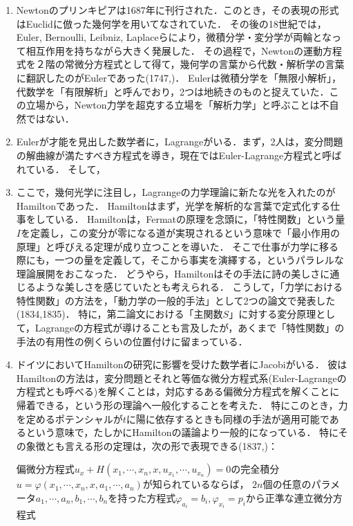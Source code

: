 \documentclass[uplatex, dvipdfmx]{jsarticle}
\begin{document}
\begin{enumerate}
    \item Newtonのプリンキピアは1687年に刊行された．このとき，その表現の形式はEuclidに倣った幾何学を用いてなされていた．
    その後の18世紀では，Euler, Bernoulli, Leibniz, Laplaceらにより，微積分学・変分学が両輪となって相互作用を持ちながら大きく発展した．
    その過程で，Newtonの運動方程式を２階の常微分方程式として得て，幾何学の言葉から代数・解析学の言葉に翻訳したのがEulerであった(1747,\cite{Euler1747})．
    Eulerは微積分学を「無限小解析」，代数学を「有限解析」と呼んでおり，2つは地続きのものと捉えていた．この立場から，Newton力学を超克する立場を「解析力学」と呼ぶことは不自然ではない．
    \item Eulerが才能を見出した数学者に，Lagrangeがいる．まず，2人は，変分問題の解曲線が満たすべき方程式を導き，現在ではEuler-Lagrange方程式と呼ばれている．
    そして，
    \item ここで，幾何光学に注目し，Lagrangeの力学理論に新たな光を入れたのがHamiltonであった．
    Hamiltonはまず，光学を解析的な言葉で定式化する仕事をしている．
    Hamiltonは，Fermatの原理を念頭に，「特性関数」という量$I$を定義し，この変分が零になる道が実現されるという意味で「最小作用の原理」と呼びえる定理が成り立つことを導いた．
    そこで仕事が力学に移る際にも，一つの量を定義して，そこから事実を演繹する，というパラレルな理論展開をおこなった．
    どうやら，Hamiltonはその手法に詩の美しさに通じるような美しさを感じていたとも考えられる．
    こうして，「力学における特性関数」の方法を，「動力学の一般的手法」として2つの論文で発表した(1834\cite{Hamilton34},1835\cite{Hamilton35})．
    特に，第二論文における「主関数$S$」に対する変分原理として，Lagrangeの方程式が導けることも言及したが，あくまで「特性関数」の手法の有用性の例くらいの位置付けに留まっている．
    \item ドイツにおいてHamiltonの研究に影響を受けた数学者にJacobiがいる．
    彼はHamiltonの方法は，変分問題とそれと等価な微分方程式系(Euler-Lagrangeの方程式とも呼べる)を解くことは，対応するある偏微分方程式を解くことに帰着できる，という形の理論へ一般化することを考えた．
    特にこのとき，力を定めるポテンシャルが$t$に陽に依存するときも同様の手法が適用可能であるという意味で，たしかにHamiltonの議論より一般的になっている．
    特にその象徴とも言える形の定理は，次の形で表現できる(1837,\cite{Jacobi37B})：
    \begin{theorem}
        偏微分方程式$u_x+H(x_1,\cdots,x_n,x,u_{x_1},\cdots,u_{x_n})=0$の完全積分$u=\varphi(x_1,\cdots,x_n,x,a_1,\cdots,a_n)$が知られているならば，
        $2n$個の任意のパラメータ$a_1,\cdots,a_n,b_1,\cdots,b_n$を持った方程式$\varphi_{a_i}=b_i,\varphi_{x_i}=p_i$から正準な連立微分方程式

\end{theorem}
\end{enumerate}
\end{document}

